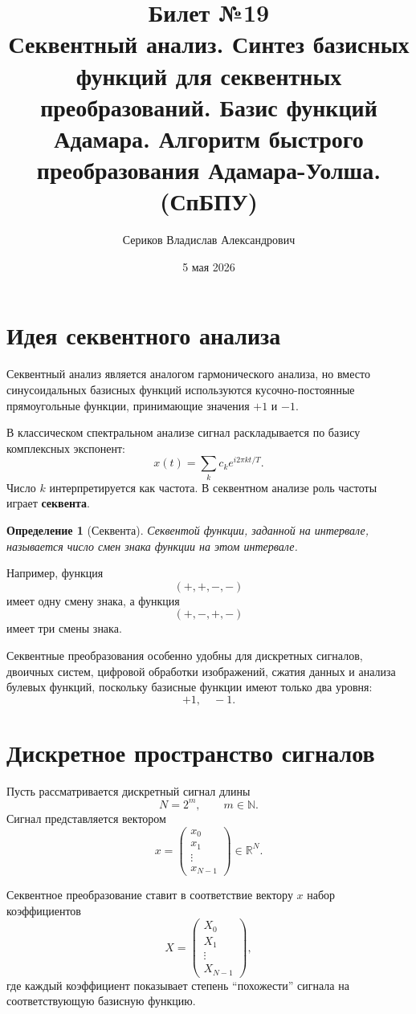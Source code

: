 \documentclass[12pt,a4paper]{article}
\title{Билет №19 \\ \small Секвентный анализ. Синтез базисных функций для секвентных преобразований. Базис функций Адамара. Алгоритм быстрого преобразования Адамара-Уолша. (СпБПУ)}
\author{Сериков Владислав Александрович}
\date{5 мая 2026}
\newtheorem{definition}{Определение}
\begin{document}
\maketitle
\tableofcontents
\newpage

\section{Идея секвентного анализа}

Секвентный анализ является аналогом гармонического анализа, но вместо синусоидальных базисных функций используются кусочно-постоянные прямоугольные функции, принимающие значения $+1$ и $-1$.

В классическом спектральном анализе сигнал раскладывается по базису комплексных экспонент:
\[
    x(t)=\sum_{k} c_k e^{i2\pi kt/T}.
\]
Число $k$ интерпретируется как частота. В секвентном анализе роль частоты играет \textbf{секвента}.

\begin{definition}[Секвента]
Секвентой функции, заданной на интервале, называется число смен знака функции на этом интервале.
\end{definition}

Например, функция
\[
    (+,+,-,-)
\]
имеет одну смену знака, а функция
\[
    (+,-,+,-)
\]
имеет три смены знака.

Секвентные преобразования особенно удобны для дискретных сигналов, двоичных систем, цифровой обработки изображений, сжатия данных и анализа булевых функций, поскольку базисные функции имеют только два уровня:
\[
    +1,\quad -1.
\]

\section{Дискретное пространство сигналов}

Пусть рассматривается дискретный сигнал длины
\[
    N=2^m,\qquad m\in\mathbb{N}.
\]
Сигнал представляется вектором
\[
    x=
    \begin{pmatrix}
        x_0\\x_1\\ \vdots\\ x_{N-1}
    \end{pmatrix}
    \in \mathbb{R}^N.
\]

Секвентное преобразование ставит в соответствие вектору $x$ набор коэффициентов
\[
    X=
    \begin{pmatrix}
        X_0\\X_1\\ \vdots\\ X_{N-1}
    \end{pmatrix},
\]
где каждый коэффициент показывает степень ``похожести'' сигнала на соответствующую базисную функцию.
\end{document}
